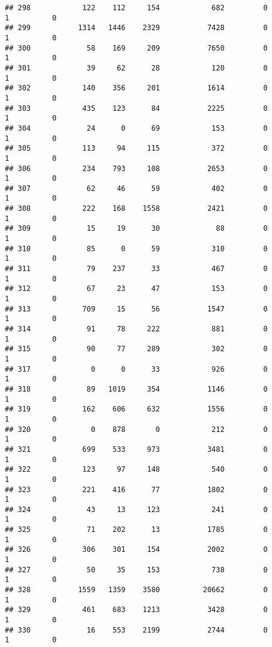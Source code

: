 \documentclass[
]{article}
\begin{document}
\begin{verbatim}
## 298            122    112     154            682         0         1          0
## 299           1314   1446    2329           7428         0         1          0
## 300             58    169     209           7650         0         1          0
## 301             39     62      28            120         0         1          0
## 302            140    356     201           1614         0         1          0
## 303            435    123      84           2225         0         1          0
## 304             24      0      69            153         0         1          0
## 305            113     94     115            372         0         1          0
## 306            234    793     108           2653         0         1          0
## 307             62     46      59            402         0         1          0
## 308            222    168    1558           2421         0         1          0
## 309             15     19      30             88         0         1          0
## 310             85      0      59            310         0         1          0
## 311             79    237      33            467         0         1          0
## 312             67     23      47            153         0         1          0
## 313            709     15      56           1547         0         1          0
## 314             91     78     222            881         0         1          0
## 315             90     77     289            302         0         1          0
## 317              0      0      33            926         0         1          0
## 318             89   1019     354           1146         0         1          0
## 319            162    606     632           1556         0         1          0
## 320              0    878       0            212         0         1          0
## 321            699    533     973           3481         0         1          0
## 322            123     97     148            540         0         1          0
## 323            221    416      77           1802         0         1          0
## 324             43     13     123            241         0         1          0
## 325             71    202      13           1785         0         1          0
## 326            306    301     154           2002         0         1          0
## 327             50     35     153            738         0         1          0
## 328           1559   1359    3580          20662         0         1          0
## 329            461    683    1213           3428         0         1          0
## 330             16    553    2199           2744         0         1          0

\end{verbatim}
\end{document}
